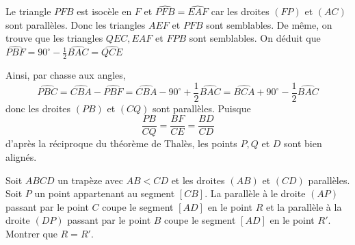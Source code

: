 \begin{sol}
\begin{center}
\end{center}

Le triangle $PFB$ est isocèle en $F$ et $\widehat{PFB}=\widehat{EAF}$ car les droites $(FP)$ et $(AC)$ sont parallèles. Donc les triangles $AEF$ et $PFB$ sont semblables. De même, on trouve que les triangles $QEC, EAF$ et $FPB$ sont semblables. On déduit que $\widehat{PBF}=90^\circ-\frac1{2}\widehat{BAC}=\widehat{QCE}$

Ainsi, par chasse aux angles, $$\widehat{PBC}=\widehat{CBA}-\widehat{PBF}=\widehat{CBA}-90^\circ+\frac1{2}\widehat{BAC}=\widehat{BCA}+90^\circ-\frac1{2}\widehat{BAC}$$
donc les droites $(PB)$ et $(CQ)$ sont parallèles. Puisque
$$\frac{PB}{CQ}=\frac{BF}{CE}=\frac{BD}{CD}$$ d'après la réciproque du théorème de Thalès, les points $P,Q$ et $D$ sont bien alignés.
\end{sol}

\begin{exo}
Soit $ABCD$ un trapèze avec $AB<CD$ et les droites $(AB)$ et $(CD)$ parallèles. Soit $P$ un point appartenant au segment $[CB]$. La parallèle à le droite $(AP)$ passant par le point $C$ coupe le segment $[AD]$ en le point $R$ et la parallèle à la droite $(DP)$ passant par le point $B$ coupe le segment $[AD]$ en le point $R'$. Montrer que $R=R'$.
\end{exo}

